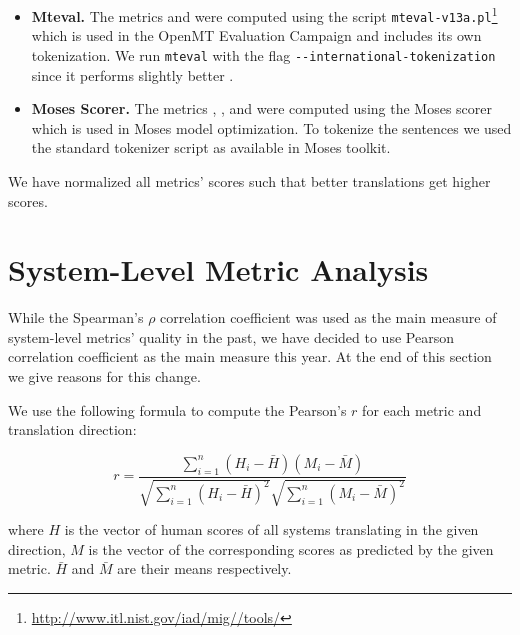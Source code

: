 \begin{itemize}

\item \textbf{Mteval.} The metrics   and
      were computed using the script
    \texttt{mteval-v13a.pl}\footnote{\url{http://www.itl.nist.gov/iad/mig//tools/}}
    which is used in the OpenMT Evaluation Campaign and includes its own
    tokenization.  We run \texttt{mteval} with the flag
    \texttt{-{}-international-tokenization} since it performs slightly better
    .

\item \textbf{Moses Scorer.} The metrics  ,
    ,  and  
    were computed using the Moses scorer which is used in Moses model
    optimization. To tokenize the sentences we used the standard tokenizer
    script as available in Moses toolkit.


\end{itemize}

We have normalized all metrics' scores such that better translations get higher scores. 


\section{System-Level Metric Analysis}
\label{system-level}


While the Spearman's $\rho$ correlation coefficient was used as the main
measure of system-level metrics' quality in the past, we have decided to use
Pearson correlation coefficient as the main measure this year. At the end of
this section we give reasons for this change. 

We use the following formula to compute the Pearson's $r$ for each metric and
translation direction:

\begin{equation}
    r = \frac{\sum ^n _{i=1}(H_i - \bar{H})(M_i - \bar{M})}{\sqrt{\sum ^n _{i=1}(H_i - \bar{H})^2} \sqrt{\sum ^n _{i=1}(M_i - \bar{M})^2}} 
\end{equation}

\noindent where $H$ is the vector of human scores of all systems translating in
the given
direction, $M$ is the vector of the corresponding scores as predicted by the
given metric. $\bar{H}$ and $\bar{M}$ are their means respectively.


